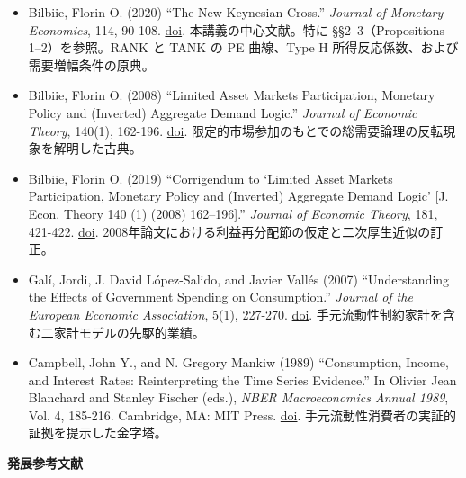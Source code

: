\documentclass[
  japanese,
  lualatex,
  ja=standard,
  12pt,
  a4paper]{ltjsarticle}
\providecommand{\tightlist}{%
  \setlength{\itemsep}{0pt}\setlength{\parskip}{0pt}}
\begin{document}
\begin{itemize}
\tightlist
\item
  Bilbiie, Florin O. (2020) ``The New Keynesian Cross.'' \emph{Journal
  of Monetary Economics}, 114, 90-108.
  \href{https://doi.org/10.1016/j.jmoneco.2019.03.003}{doi}.
  本講義の中心文献。特に §§2--3（Propositions 1--2）を参照。RANK と TANK
  の PE 曲線、Type H 所得反応係数、および需要増幅条件の原典。
\item
  Bilbiie, Florin O. (2008) ``Limited Asset Markets Participation,
  Monetary Policy and (Inverted) Aggregate Demand Logic.'' \emph{Journal
  of Economic Theory}, 140(1), 162-196.
  \href{https://doi.org/10.1016/j.jet.2007.07.008}{doi}.
  限定的市場参加のもとでの総需要論理の反転現象を解明した古典。
\item
  Bilbiie, Florin O. (2019) ``Corrigendum to `Limited Asset Markets
  Participation, Monetary Policy and (Inverted) Aggregate Demand Logic'
  {[}J. Econ. Theory 140 (1) (2008) 162--196{]}.'' \emph{Journal of
  Economic Theory}, 181, 421-422.
  \href{https://doi.org/10.1016/j.jet.2019.03.008}{doi}.
  2008年論文における利益再分配節の仮定と二次厚生近似の訂正。
\item
  Galí, Jordi, J. David López-Salido, and Javier Vallés (2007)
  ``Understanding the Effects of Government Spending on Consumption.''
  \emph{Journal of the European Economic Association}, 5(1), 227-270.
  \href{https://doi.org/10.1162/JEEA.2007.5.1.227}{doi}.
  手元流動性制約家計を含む二家計モデルの先駆的業績。
\item
  Campbell, John Y., and N. Gregory Mankiw (1989) ``Consumption, Income,
  and Interest Rates: Reinterpreting the Time Series Evidence.'' In
  Olivier Jean Blanchard and Stanley Fischer (eds.), \emph{NBER
  Macroeconomics Annual 1989}, Vol. 4, 185-216. Cambridge, MA: MIT
  Press. \href{https://doi.org/10.1086/654107}{doi}.
  手元流動性消費者の実証的証拠を提示した金字塔。
\end{itemize}

\textbf{発展参考文献}
\end{document}
